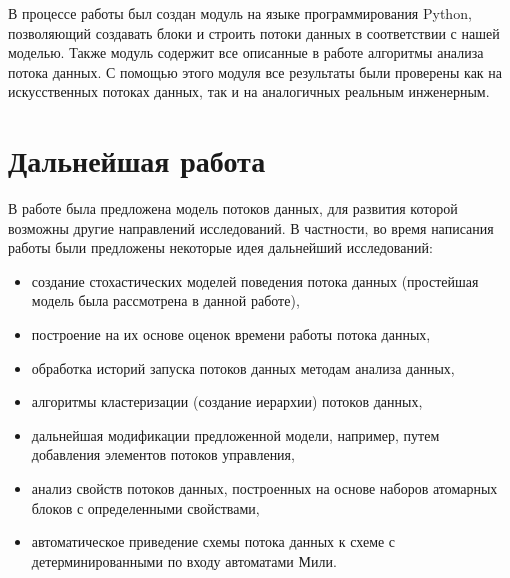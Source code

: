 \documentclass[10pt,a4paper]{article}
\begin{document}
  В процессе работы был создан модуль на языке программирования Python, позволяющий создавать блоки и строить потоки данных в соответствии с нашей моделью.
  Также модуль содержит все описанные в работе алгоритмы анализа потока данных. С помощью этого модуля все результаты были проверены как на искусственных
  потоках данных, так и на аналогичных реальным инженерным.
  
\section{Дальнейшая работа}
  В работе была предложена модель потоков данных, для развития которой возможны другие направлений исследований.
  В частности, во время написания работы были предложены некоторые идея дальнейший исследований:
  \begin{itemize}
    \item создание стохастических моделей поведения потока данных (простейшая модель была рассмотрена в данной работе),
    \item построение на их основе оценок времени работы потока данных,
    \item обработка историй запуска потоков данных методам анализа данных,
    \item алгоритмы кластеризации (создание иерархии) потоков данных,
    \item дальнейшая модификации предложенной модели, например, путем добавления элементов потоков управления,
    \item анализ свойств потоков данных, построенных на основе наборов атомарных блоков с определенными свойствами,
    \item автоматическое приведение схемы потока данных к схеме с детерминированными по входу автоматами Мили.
  \end{itemize}

\newpage 
  
\end{document}
